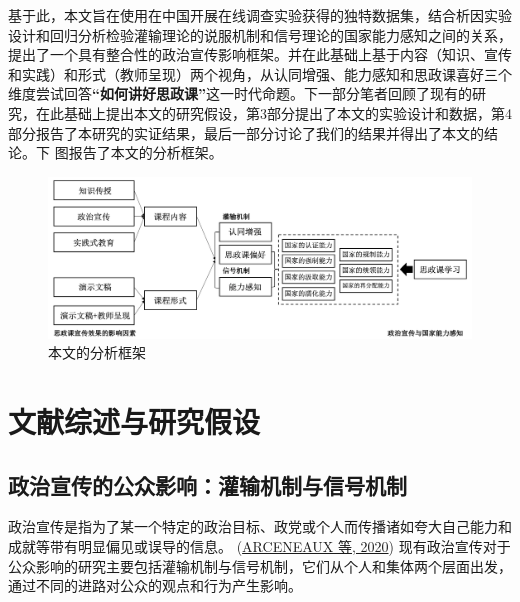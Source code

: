 \documentclass[
  12pt,
]{ctexart}
\begin{document}
基于此，本文旨在使用在中国开展在线调查实验获得的独特数据集，结合析因实验设计和回归分析检验灌输理论的说服机制和信号理论的国家能力感知之间的关系，提出了一个具有整合性的政治宣传影响框架。并在此基础上基于内容（知识、宣传和实践）和形式（教师呈现）两个视角，从认同增强、能力感知和思政课喜好三个维度尝试回答\textbf{``如何讲好思政课''}这一时代命题。下一部分笔者回顾了现有的研究，在此基础上提出本文的研究假设，第3部分提出了本文的实验设计和数据，第4部分报告了本研究的实证结果，最后一部分讨论了我们的结果并得出了本文的结论。下
图报告了本文的分析框架。

\begin{figure}[h]
\includegraphics[width=1\linewidth]{../figures/figure1} \caption{本文的分析框架}\label{fig:unnamed-chunk-1}
\end{figure}

\hypertarget{ux6587ux732eux7efcux8ff0ux4e0eux7814ux7a76ux5047ux8bbe}{%
\section{文献综述与研究假设}\label{ux6587ux732eux7efcux8ff0ux4e0eux7814ux7a76ux5047ux8bbe}}

\hypertarget{ux653fux6cbbux5ba3ux4f20ux7684ux516cux4f17ux5f71ux54cdux704cux8f93ux673aux5236ux4e0eux4fe1ux53f7ux673aux5236}{%
\subsection{政治宣传的公众影响：灌输机制与信号机制}\label{ux653fux6cbbux5ba3ux4f20ux7684ux516cux4f17ux5f71ux54cdux704cux8f93ux673aux5236ux4e0eux4fe1ux53f7ux673aux5236}}

政治宣传是指为了某一个特定的政治目标、政党或个人而传播诸如夸大自己能力和成就等带有明显偏见或误导的信息。
(\protect\hyperlink{ref-ArceneauxTruex2020}{ARCENEAUX 等, 2020}) 现有政治宣传对于公众影响的研究主要包括灌输机制与信号机制，它们从个人和集体两个层面出发，通过不同的进路对公众的观点和行为产生影响。
\end{document}
